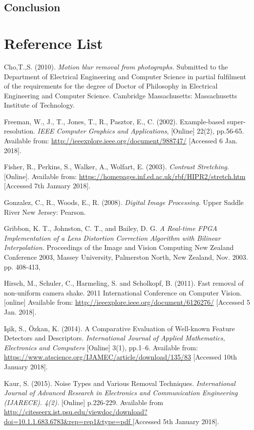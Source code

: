 \documentclass[a4paper, 12pt]{article}
\begin{document}
\subsection{Conclusion}
\newpage
\section{Reference List} 

Cho,T.,S. (2010). \textit{Motion blur removal from photographs.} Submitted to the Department of Electrical Engineering and Computer Science in partial fulfilment of the requirements for the degree of Doctor of Philosophy in Electrical Engineering and Computer Science. Cambridge Massachusetts: Massachusetts Institute of Technology.
 
Freeman, W., J., T., Jones, T., R.,  Pasztor, E., C. (2002). Example-based super-resolution. \textit{IEEE Computer Graphics and Applications}, [Online] 22(2), pp.56-65. Available from: \url{http://ieeexplore.ieee.org/document/988747/} [Accessed 6 Jan. 2018].

Fisher, R., Perkins, S., Walker, A., Wolfart, E. (2003). \textit{Contrast Stretching}. [Online]. Available from: \url{https://homepages.inf.ed.ac.uk/rbf/HIPR2/stretch.htm} [Accessed 7th January 2018].

Gonzalez, C., R., Woods, E., R. (2008). \textit{Digital Image Processing.} Upper Saddle River New Jersey: Pearson.

Gribbon, K. T., Johnston, C. T., and Bailey, D.
G. \textit{A Real-time FPGA Implementation of a
Lens Distortion Correction Algorithm with
Bilinear Interpolation.} Proceedings of the
Image and Vision Computing New Zealand
Conference 2003, Massey University,
Palmerston North, New Zealand, Nov. 2003. pp. 408-413,

Hirsch, M., Schuler, C., Harmeling, S. and Scholkopf, B. (2011). Fast removal of non-uniform camera shake. 2011 International Conference on Computer Vision. [online] Available from: \url{http://ieeexplore.ieee.org/document/6126276/} [Accessed 5 Jan. 2018].

Işik, S., Özkan, K. (2014). A Comparative Evaluation of Well-known Feature Detectors and Descriptors. \textit{International Journal of Applied Mathematics, Electronics and Computers} [Online] 3(1), pp.1–6. Available from: \url{https://www.atscience.org/IJAMEC/article/download/135/83} [Accessed 10th January 2018].  

Kaur, S. (2015). Noise Types and Various Removal Techniques. \textit{International Journal of Advanced Research in Electronics and Communication Engineering (IJARECE). 4(2).} [Online] p.226-229. Available from \url{http://citeseerx.ist.psu.edu/viewdoc/download?doi=10.1.1.683.6783&rep=rep1&type=pdf
} [Accessed 5th January 2018].
\end{document}
